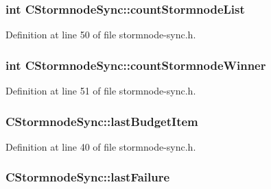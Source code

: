\hypertarget{class_c_stormnode_sync_a5b480191e47be00a7b1919244b5f9714}{}
\subsubsection[{count\+Stormnode\+List}]{\setlength{\rightskip}{0pt plus 5cm}int C\+Stormnode\+Sync\+::count\+Stormnode\+List}\label{class_c_stormnode_sync_a5b480191e47be00a7b1919244b5f9714}


Definition at line 50 of file stormnode-\/sync.\+h.

\hypertarget{class_c_stormnode_sync_ad0db06b3a1913c0c40c8e6719953d346}{}
\subsubsection[{count\+Stormnode\+Winner}]{\setlength{\rightskip}{0pt plus 5cm}int C\+Stormnode\+Sync\+::count\+Stormnode\+Winner}\label{class_c_stormnode_sync_ad0db06b3a1913c0c40c8e6719953d346}


Definition at line 51 of file stormnode-\/sync.\+h.

\hypertarget{class_c_stormnode_sync_a5499eabbf28dc8ec6f77cfef1569dbb7}{}
\subsubsection[{last\+Budget\+Item}]{ C\+Stormnode\+Sync\+::last\+Budget\+Item}\label{class_c_stormnode_sync_a5499eabbf28dc8ec6f77cfef1569dbb7}


Definition at line 40 of file stormnode-\/sync.\+h.

\hypertarget{class_c_stormnode_sync_a8b236ed2df48f8d8fdbec1e07872f34f}{}
\subsubsection[{last\+Failure}]{ C\+Stormnode\+Sync\+::last\+Failure}\label{class_c_stormnode_sync_a8b236ed2df48f8d8fdbec1e07872f34f}


